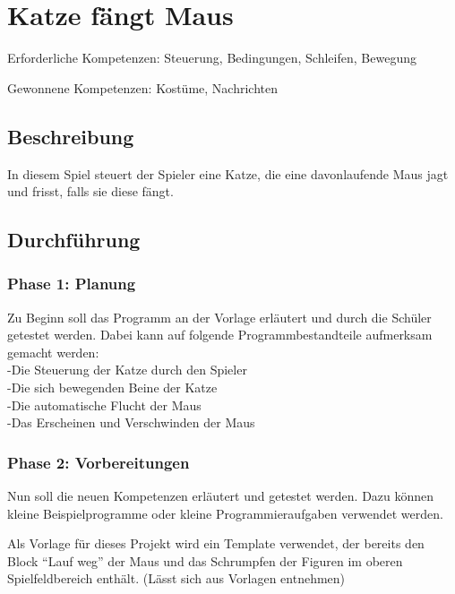 \section{Katze fängt Maus}\label{katze-fuxe4ngt-maus}

Erforderliche Kompetenzen: Steuerung, Bedingungen, Schleifen, Bewegung

Gewonnene Kompetenzen: Kostüme, Nachrichten

\begin{figure}[ht]
    \centering 
    \caption[\Sectionname]{\Sectionname}
\end{figure}

\subsection{Beschreibung}\label{beschreibung}

In diesem Spiel steuert der Spieler eine Katze, die eine davonlaufende
Maus jagt und frisst, falls sie diese fängt.

\subsection{Durchführung}\label{durchfuxfchrung}

\subsubsection{Phase 1: Planung}\label{phase-1-planung}

Zu Beginn soll das Programm an der Vorlage erläutert und durch die
Schüler getestet werden. Dabei kann auf folgende Programmbestandteile
aufmerksam gemacht werden:\\
-Die Steuerung der Katze durch den Spieler\\
-Die sich bewegenden Beine der Katze\\
-Die automatische Flucht der Maus\\
-Das Erscheinen und Verschwinden der Maus

\subsubsection{Phase 2: Vorbereitungen}\label{phase-2-vorbereitungen}

Nun soll die neuen Kompetenzen erläutert und getestet werden. Dazu
können kleine Beispielprogramme oder kleine Programmieraufgaben
verwendet werden.

Als Vorlage für dieses Projekt wird ein Template verwendet, der bereits
den Block ``Lauf weg'' der Maus und das Schrumpfen der Figuren im oberen
Spielfeldbereich enthält. (Lässt sich aus Vorlagen entnehmen)

